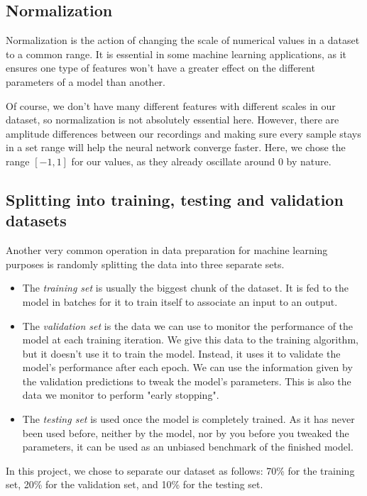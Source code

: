\subsection{Normalization}

Normalization is the action of changing the scale of numerical values in a dataset to a common range. It is essential in some machine learning applications, as it ensures one type of features won't have a greater effect on the different parameters of a model than another.

Of course, we don't have many different features with different scales in our dataset, so normalization is not absolutely essential here. However, there are amplitude differences between our recordings and making sure every sample stays in a set range will help the neural network converge faster. Here, we chose the range $[-1, 1]$ for our values, as they already oscillate around 0 by nature.

\subsection{Splitting into training, testing and validation datasets}

Another very common operation in data preparation for machine learning purposes is randomly splitting the data into three separate sets.

\begin{itemize}
  \item The \textit{training set} is usually the biggest chunk of the dataset. It is fed to the model in batches for it to train itself to associate an input to an output.
  \item The \textit{validation set} is the data we can use to monitor the performance of the model at each training iteration. We give this data to the training algorithm, but it doesn't use it to train the model. Instead, it uses it to validate the model's performance after each epoch. We can use the information given by the validation predictions to tweak the model's parameters. This is also the data we monitor to perform "early stopping".
  \item The \textit{testing set} is used once the model is completely trained. As it has never been used before, neither by the model, nor by you before you tweaked the parameters, it can be used as an unbiased benchmark of the finished model.
\end{itemize}

In this project, we chose to separate our dataset as follows: 70\% for the training set, 20\% for the validation set, and 10\% for the testing set.
